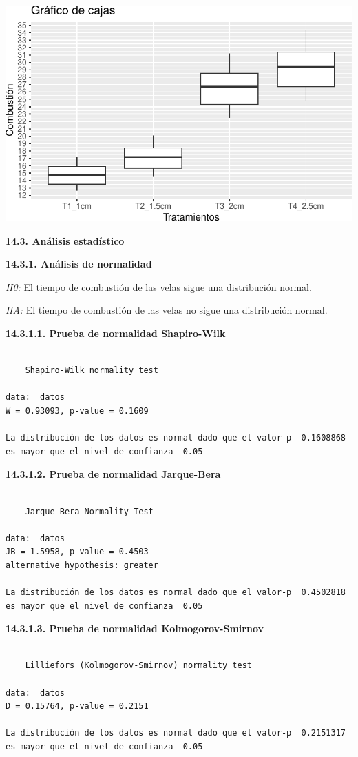 \documentclass[
  letterpaper,
  DIV=11,
  numbers=noendperiod]{scrartcl}
\begin{document}
\includegraphics{Documento_files/figure-pdf/unnamed-chunk-3-1.pdf}

\textbf{14.3. Análisis estadístico}

\textbf{14.3.1. Análisis de normalidad}

\emph{H0:} El tiempo de combustión de las velas sigue una distribución
normal.

\emph{HA:} El tiempo de combustión de las velas no sigue una
distribución normal.

\textbf{14.3.1.1. Prueba de normalidad Shapiro-Wilk}

\begin{verbatim}

    Shapiro-Wilk normality test

data:  datos
W = 0.93093, p-value = 0.1609

La distribución de los datos es normal dado que el valor-p  0.1608868  es mayor que el nivel de confianza  0.05
\end{verbatim}

\textbf{14.3.1.2. Prueba de normalidad Jarque-Bera}

\begin{verbatim}

    Jarque-Bera Normality Test

data:  datos
JB = 1.5958, p-value = 0.4503
alternative hypothesis: greater

La distribución de los datos es normal dado que el valor-p  0.4502818  es mayor que el nivel de confianza  0.05
\end{verbatim}

\textbf{14.3.1.3. Prueba de normalidad Kolmogorov-Smirnov}

\begin{verbatim}

    Lilliefors (Kolmogorov-Smirnov) normality test

data:  datos
D = 0.15764, p-value = 0.2151

La distribución de los datos es normal dado que el valor-p  0.2151317  es mayor que el nivel de confianza  0.05
\end{verbatim}
\end{document}
